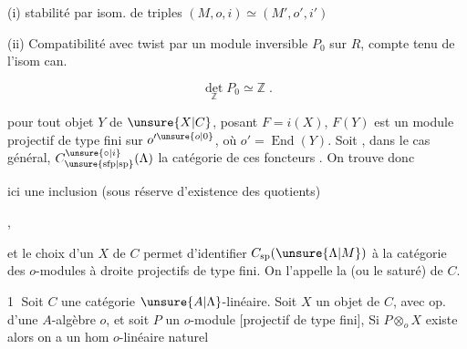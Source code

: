 (i) stabilité par isom. de triples $(M,o,i)\simeq(M',o',i')$

(ii) Compatibilité avec twist par un module inversible $P_0$ sur $R$, compte tenu de l'isom can.

\[
\det_{\mathbb Z}P_0\simeq\mathbb Z\;.
\]


 pour tout objet $Y$ de $\unsure{X|C}$,  posant $F=i(X)$,
$F(Y)$ est un module  projectif de type fini sur
$o'^{\unsure{o|0}}$, où $o'=\operatorname{End}(Y)$. Soit , dans le cas général,
 $C^{\unsure{\circ|i}}_{\unsure{\mathrm{sfp}|\mathrm{sp}}}(\Lambda)$ la catégorie de ces foncteurs . On trouve donc


ici une inclusion (sous réserve d'existence des quotients)

,

et le choix d'un   $X$ de $C$ permet d'identifier $C_{\mathrm{sp}}(\unsure{\Lambda|M})$ à la catégorie des $o$-modules
à droite projectifs de type fini.  On l'appelle
la    (ou le saturé) de $C$.



\textcircled{1} Soit $C$ une catégorie $\unsure{A|\Lambda}$-linéaire. Soit  $X$ un objet de
$C$, avec op. d'une $A$-algèbre $o$, et soit $P$ un
$o$-module  [projectif de type fini], Si $P\otimes_o X$ existe
alors on a un hom $o$-linéaire  naturel

